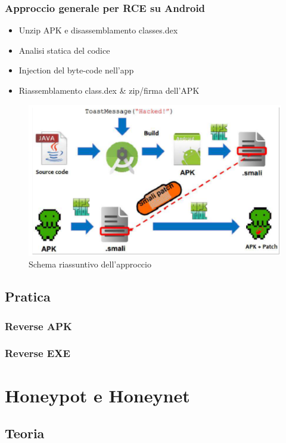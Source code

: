 \documentclass{article}
\begin{document}
\subsubsection{Approccio generale per RCE su Android}
\begin{itemize}
    \item Unzip APK e disassemblamento classes.dex
    \item Analisi statica del codice
    \item Injection del byte-code nell’app
    \item Riassemblamento class.dex \& zip/firma dell’APK
\end{itemize}
\begin{figure}[H]
    \center
    \includegraphics[scale=0.6]{images/RCE7.png}
    \caption{Schema riassuntivo dell'approccio}\label{fig:1}
\end{figure}
\subsection{Pratica}

\subsubsection{Reverse APK}

\subsubsection{Reverse EXE}

\section{Honeypot e Honeynet}
\subsection{Teoria}
\end{document}
